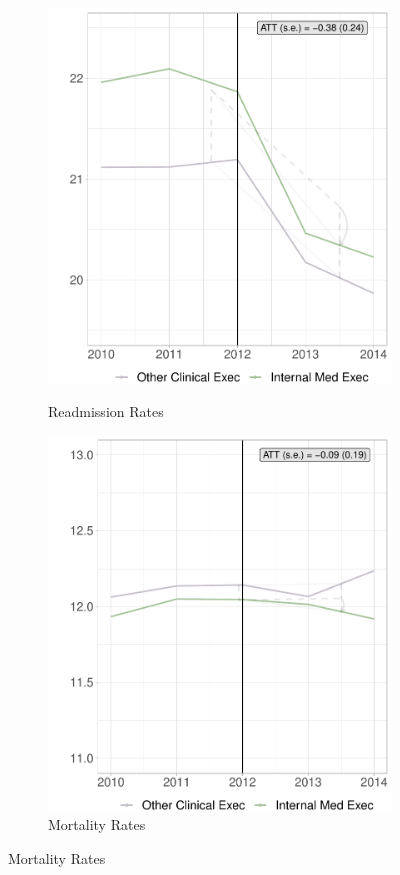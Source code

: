 \documentclass[12pt]{article}
\begin{document}
    \begin{figure}[ht!]
     \caption{Effect of Internal Medicine Training on Quality}
     \centering
     \begin{subfigure}[b]{0.45\textwidth}
         \centering
         \caption{Readmission Rates}
         \includegraphics[width=\textwidth]{Objects/read_specialty_synth_graph.pdf}
         \label{fig:read_spec}
     \end{subfigure}
     \hfill
     \begin{subfigure}[b]{0.45\textwidth}
         \centering
         \caption{Mortality Rates}
         \includegraphics[width=\textwidth]{Objects/mort_specialty_synth_graph.pdf}

\end{subfigure}
\end{figure}
\end{document}
